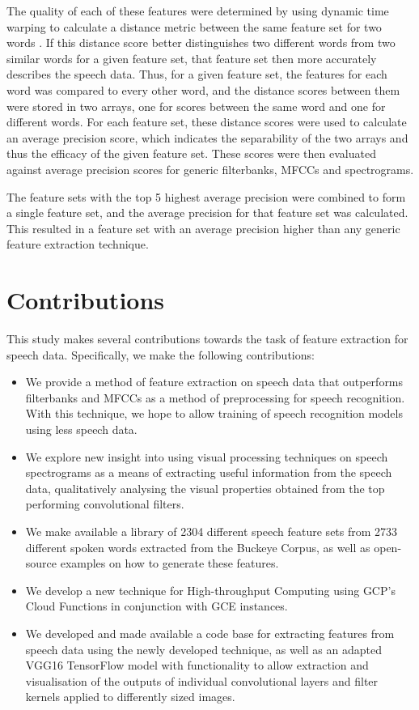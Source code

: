 The quality of each of these features were determined by using dynamic time warping to calculate a distance metric between the same feature set for two words \cite{DBLP:conf/interspeech/CarlinTJH11}. If this distance score better distinguishes two different words from two similar words for a given feature set, that feature set then more accurately describes the speech data.
Thus, for a given feature set, the features for each word was compared to every other word, and the distance scores between them were stored in two arrays, one for scores between the same word and one for different words.
For each feature set, these distance scores were used to calculate an average precision score, which indicates the separability of the two arrays and thus the efficacy of the given feature set.
These scores were then evaluated against average precision scores for generic filterbanks, MFCCs and spectrograms.

The feature sets with the top 5 highest average precision were combined to form a single feature set, and the average precision for that feature set was calculated.
This resulted in a feature set with an average precision  higher than any generic feature extraction technique.

\section{Contributions}

This study makes several contributions towards the task of feature extraction for speech data.
Specifically, we make the following contributions:

\begin{itemize}
\item We provide a method of feature extraction on speech data that outperforms filterbanks and MFCCs as a method of preprocessing for speech recognition.
With this technique, we hope to allow training of speech recognition models using less speech data.
\item We explore new insight into using visual processing techniques on speech spectrograms as a means of extracting useful information from the speech data, qualitatively analysing the visual properties obtained from the top performing convolutional filters.
\item We make available a library of 2304 different speech feature sets from 2733 different spoken words extracted from the Buckeye Corpus, as well as open-source examples on how to generate these features.
\item We develop a new technique for High-throughput Computing using GCP's Cloud Functions in conjunction with GCE instances.
\item We developed and made available a code base for extracting features from speech data using the newly developed technique, as well as an adapted VGG16 TensorFlow model with functionality to allow extraction and visualisation of the outputs of individual convolutional layers and filter kernels applied to differently sized  images.
\end{itemize}